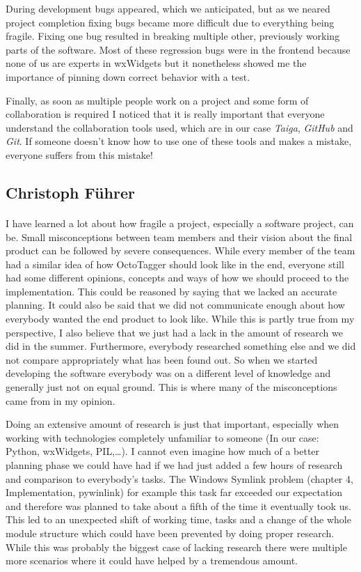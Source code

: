During development bugs appeared, which we anticipated, but as we neared
project completion fixing bugs became more difficult due to everything being
fragile. Fixing one bug resulted in breaking multiple other, previously working
parts of the software. Most of these regression bugs were in the frontend
because none of us are experts in wxWidgets but it nonetheless showed me the
importance of pinning down correct behavior with a test.

Finally, as soon as multiple people work on a project and some form of
collaboration is required I noticed that it is really important that everyone
understand the collaboration tools used, which are in our case \emph{Taiga},
\emph{GitHub} and \emph{Git}. If someone doesn't know how to use one of
these tools and makes a mistake, everyone suffers from this mistake!

\subsection{Christoph Führer}

\paragraph{}
I have learned a lot about how fragile a project, especially a software project, can be. Small misconceptions between team members and their vision about the final product can be followed by severe consequences. While every member of the team had a similar idea of how OctoTagger should look like in the end, everyone still had some different opinions, concepts and ways of how we should proceed to the implementation. This could be reasoned by saying that we lacked an accurate planning. It could also be said that we did not communicate enough about how everybody wanted the end product to look like. While this is partly true from my perspective, I also believe that we just had a lack in the amount of research we did in the summer. Furthermore, everybody researched something else and we did not compare appropriately what has been found out. So when we started developing the software everybody was on a different level of knowledge and generally just not on equal ground. This is where many of the misconceptions came from in my opinion.  

Doing an extensive amount of research is just that important, especially when working with technologies completely unfamiliar to someone (In our case: Python, wxWidgets, PIL,\ldots). I cannot even imagine how much of a better planning phase we could have had if we had just added a few hours of research and comparison to everybody's tasks. The Windows Symlink problem (chapter 4, Implementation, pywinlink) for example this task far exceeded our expectation and therefore was planned to take about a fifth of the time it eventually took us. This led to an unexpected shift of working time, tasks and a change of the whole module structure which could have been prevented by doing proper research. While this was probably the biggest case of lacking research there were multiple more scenarios where it could have helped by a tremendous amount.

